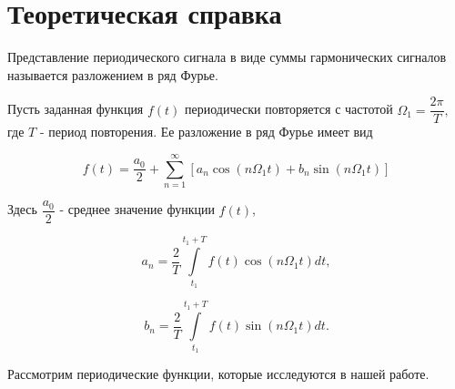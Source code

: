\documentclass[a4paper,12pt]{extarticle}
\begin{document}
\section*{Теоретическая справка}

Представление периодического сигнала в виде суммы гармонических сигналов называется разложением в ряд Фурье.
	
	Пусть заданная функция $f(t)$ периодически повторяется с частотой $\Omega_{1}=\dfrac{2\pi}{T},$ где $T$ - период повторения. Ее разложение в ряд Фурье имеет вид
	
	$$ f(t)=\dfrac{a_{0}}{2}+ \sum\limits_{n=1}^\infty [a_{n}\cos(n \Omega_{1}t)+b_{n}\sin(n \Omega_{1} t) ]$$
	
	Здесь $\dfrac{a_{0}}{2}$ - среднее значение функции $f(t)$,
	
	$$ a_{n}=\dfrac{2}{T}\int\limits_{t_{1}}^{t_{1}+T}f(t)\cos(n \Omega_{1} t)dt, $$
	
	$$ b_{n}=\dfrac{2}{T}\int\limits_{t_{1}}^{t_{1}+T}f(t)\sin(n \Omega_{1} t)dt. $$
	
	
	Рассмотрим периодические функции, которые исследуются в нашей
	работе.
	
\end{document}
